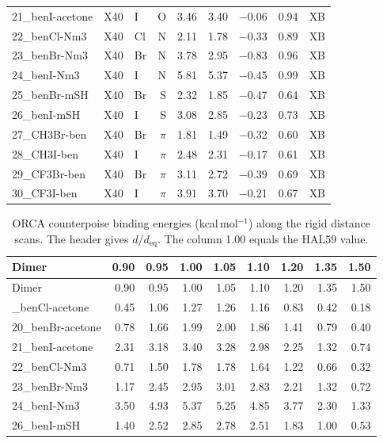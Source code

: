 \documentclass[journal=jcisd8,manuscript=suppinfo]{achemso}
\begin{document}
\begin{singlespace}
{\begin{longtable}{lllrrrrrl}
21\_benI-acetone & X40 & I & O & 3.46 & 3.40 & $-$0.06 & 0.94 & XB\\
22\_benCl-Nm3 & X40 & Cl & N & 2.11 & 1.78 & $-$0.33 & 0.89 & XB\\
23\_benBr-Nm3 & X40 & Br & N & 3.78 & 2.95 & $-$0.83 & 0.96 & XB\\
24\_benI-Nm3 & X40 & I & N & 5.81 & 5.37 & $-$0.45 & 0.99 & XB\\
25\_benBr-mSH & X40 & Br & S & 2.32 & 1.85 & $-$0.47 & 0.64 & XB\\
26\_benI-mSH & X40 & I & S & 3.08 & 2.85 & $-$0.23 & 0.73 & XB\\
27\_CH3Br-ben & X40 & Br & $\pi$ & 1.81 & 1.49 & $-$0.32 & 0.60 & XB\\
28\_CH3I-ben & X40 & I & $\pi$ & 2.48 & 2.31 & $-$0.17 & 0.61 & XB\\
29\_CF3Br-ben & X40 & Br & $\pi$ & 3.11 & 2.72 & $-$0.39 & 0.69 & XB\\
30\_CF3I-ben & X40 & I & $\pi$ & 3.91 & 3.70 & $-$0.21 & 0.67 & XB\\
\end{longtable}}
{\scriptsize
\setlength{\tabcolsep}{3pt}
\begin{longtable}{lrrrrrrrr}
\caption{ORCA counterpoise binding energies (kcal\,mol$^{-1}$) along the rigid distance scans. The header gives $d/d_\mathrm{eq}$. The column 1.00 equals the HAL59 value.}\label{tab:cpdist}\\
\toprule
Dimer & 0.90 & 0.95 & 1.00 & 1.05 & 1.10 & 1.20 & 1.35 & 1.50\\
\midrule
\endfirsthead
\toprule
Dimer & 0.90 & 0.95 & 1.00 & 1.05 & 1.10 & 1.20 & 1.35 & 1.50\\
\midrule
\endhead
\bottomrule
\endlastfoot
19\_benCl-acetone & 0.45 & 1.06 & 1.27 & 1.26 & 1.16 & 0.83 & 0.42 & 0.18\\
20\_benBr-acetone & 0.78 & 1.66 & 1.99 & 2.00 & 1.86 & 1.41 & 0.79 & 0.40\\
21\_benI-acetone & 2.31 & 3.18 & 3.40 & 3.28 & 2.98 & 2.25 & 1.32 & 0.74\\
22\_benCl-Nm3 & 0.71 & 1.50 & 1.78 & 1.78 & 1.64 & 1.22 & 0.66 & 0.32\\
23\_benBr-Nm3 & 1.17 & 2.45 & 2.95 & 3.01 & 2.83 & 2.21 & 1.32 & 0.72\\
24\_benI-Nm3 & 3.50 & 4.93 & 5.37 & 5.25 & 4.85 & 3.77 & 2.30 & 1.33\\
26\_benI-mSH & 1.40 & 2.52 & 2.85 & 2.78 & 2.51 & 1.83 & 1.00 & 0.53\\

\end{longtable}}
\end{singlespace}
\end{document}
